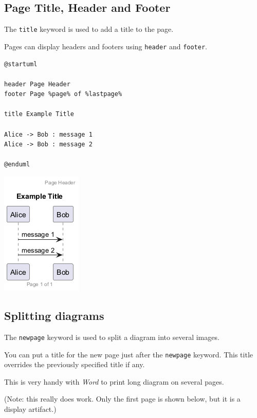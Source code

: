 \subsection{Page Title, Header and Footer}


The \texttt{title} keyword is used to add a title to the page.


Pages can display headers and footers using \texttt{header} and \texttt{footer}.


\begin{verbatim}
@startuml

header Page Header
footer Page %page% of %lastpage%

title Example Title

Alice -> Bob : message 1
Alice -> Bob : message 2

@enduml
\end{verbatim}
\begin{center}
\includegraphics[scale=0.60]{imgw/img-8f5f426c37a97e11683b8ff09dcdef7b.png}
\end{center}




%
%
\subsection{Splitting diagrams}




The \texttt{newpage} keyword is used to split a diagram into several images.


You can put a title for the new page just after the \texttt{newpage}
keyword.  This title overrides the previously specified title if any.


This is very handy with \textit{Word} to print long diagram on
several pages.


(Note: this really does work.  Only the first page is shown below, but it is a display artifact.)


